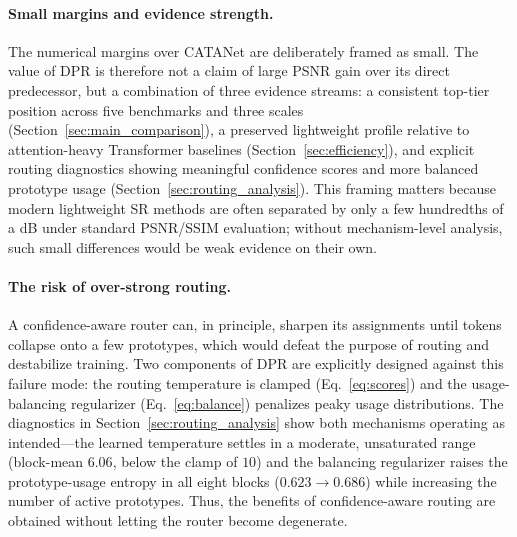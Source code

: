 \paragraph{Small margins and evidence strength.}
The numerical margins over CATANet are deliberately framed as small. The value of DPR is
therefore not a claim of large PSNR gain over its direct predecessor, but a combination of
three evidence streams: a consistent top-tier position across five benchmarks and three
scales (Section~\ref{sec:main_comparison}), a preserved lightweight profile relative to
attention-heavy Transformer baselines (Section~\ref{sec:efficiency}), and explicit routing
diagnostics showing meaningful confidence scores and more balanced prototype usage
(Section~\ref{sec:routing_analysis}). This framing matters because modern lightweight
SR methods are often separated by only a few hundredths of a dB under standard
PSNR/SSIM evaluation; without mechanism-level analysis, such small differences would be
weak evidence on their own.

\paragraph{The risk of over-strong routing.}
A confidence-aware router can, in principle, sharpen its assignments until tokens collapse
onto a few prototypes, which would defeat the purpose of routing and destabilize training.
Two components of DPR are explicitly designed against this failure mode: the routing
temperature is clamped (Eq.~\eqref{eq:scores}) and the usage-balancing regularizer
(Eq.~\eqref{eq:balance}) penalizes peaky usage distributions. The diagnostics in
Section~\ref{sec:routing_analysis} show both mechanisms operating as intended---the learned
temperature settles in a moderate, unsaturated range (block-mean $6.06$, below the clamp
of $10$) and the balancing regularizer raises the prototype-usage entropy in all eight
blocks ($0.623\!\rightarrow\!0.686$) while increasing the number of active prototypes.
Thus, the benefits of confidence-aware routing are obtained without letting the
router become degenerate.

